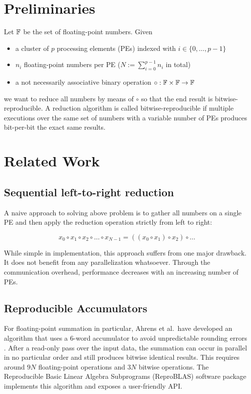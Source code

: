 \section{Preliminaries}
\label{sec:Preliminaries}
Let $\mathbb{F}$ be the set of floating-point numbers. Given
\begin{itemize}
\item a cluster of $p$ processing elements (PEs) indexed with $i \in \{0, \ldots, p - 1\}$
\item $n_i$ floating-point numbers per PE ($N := \sum_{i=0}^{p-1} n_i$ in total)
\item a not necessarily associative binary operation $\circ: \mathbb{F} \times \mathbb{F} \rightarrow \mathbb{F}$
\end{itemize}
we want to reduce all numbers by means of $\circ$ so that the end result is bitwise-reproducible.
A reduction algorithm is called bitwise-reproducible if multiple executions over the same set of numbers with a variable
number of PEs produces bit-per-bit the exact same results.


\section{Related Work}
\label{sec:RelatedWork}

\subsection{Sequential left-to-right reduction}
\label{sec:SequentialLeftToRightReduction}


A naive approach to solving above problem is to gather all numbers on a single PE and then apply the reduction
operation strictly from left to right:

\begin{equation}
x_0 \circ x_1 \circ x_2 \circ \ldots  \circ x_{N-1} = ((x_0 \circ x_1) \circ x_2) \circ \ldots
\end{equation}

While simple in implementation, this approach suffers from one major drawback. It does not benefit from any
parallelization whatsoever. Through the communication overhead, performance decreases with
an increasing number of PEs.


\subsection{Reproducible Accumulators}
\label{sec:Reproducible Accumulators}
For floating-point summation in particular, Ahrens et al.\ have developed an algorithm that uses a 6-word accumulator
to avoid unpredictable rounding errors \cite{ahrens_algorithms_2020}. After a read-only pass over the input data,
the summation can occur in parallel in no particular order and still produces bitwise identical results.
This requires around $9N$ floating-point operations and $3N$ bitwise operations.
The Reproducible Basic Linear Algebra Subprograms (ReproBLAS) software package implements this algorithm and
exposes a user-friendly API.\@

